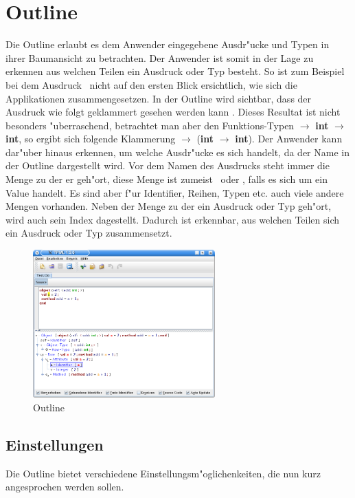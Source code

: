 \section {Outline}
\label{Outline}
Die Outline erlaubt es dem Anwender eingegebene Ausdr"ucke und Typen
in ihrer Baumansicht zu betrachten. Der Anwender ist somit in der Lage
zu erkennen aus welchen Teilen ein Ausdruck oder Typ besteht. So ist zum
Beispiel bei dem Ausdruck \grqq\ nicht auf den ersten
Blick ersichtlich, wie sich die Applikationen zusammengesetzen. In der
Outline wird sichtbar, dass der Ausdruck wie folgt geklammert gesehen
werden kann \grqq. Dieses Resultat ist nicht
besonders "uberraschend, betrachtet man aber den Funktions-Typen
 $\to$ {\bf int} $\to$ {\bf int}\grqq, so ergibt sich
folgende Klammerung  $\to$ ({\bf int} $\to$ {\bf int})\grqq.
Der Anwender kann dar"uber hinaus erkennen, um welche Ausdr"ucke es sich
handelt, da der Name in der Outline dargestellt wird. Vor dem Namen des
Ausdrucks steht immer die Menge zu der er geh"ort, diese Menge ist zumeist
\grqq\ oder \grqq, falls es sich um ein Value handelt.
Es sind aber f"ur Identifier, Reihen, Typen etc. auch viele andere Mengen
vorhanden. Neben der Menge zu der ein Ausdruck oder Typ geh"ort, wird auch
sein Index dagestellt. Dadurch ist erkennbar, aus welchen Teilen sich ein
Ausdruck oder Typ zusammensetzt.

\begin{figure}[h]
\begin{center}
\includegraphics[width=7cm]{images/outline.png}
\caption{Outline}
\end{center}
\end{figure}

\subsection {Einstellungen}
Die Outline bietet verschiedene Einstellungsm"oglichenkeiten, die nun
kurz angesprochen werden sollen.

